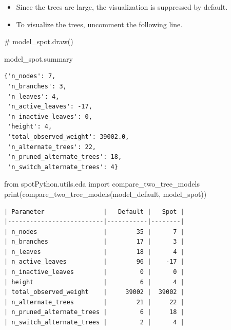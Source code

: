 \documentclass[
  letterpaper,
  DIV=11,
  numbers=noendperiod]{scrreprt}
\newenvironment{Shaded}{\begin{snugshade}}{\end{snugshade}}
\newcommand{\BuiltInTok}[1]{\textcolor[rgb]{0.00,0.23,0.31}{#1}}
\newcommand{\CommentTok}[1]{\textcolor[rgb]{0.37,0.37,0.37}{#1}}
\newcommand{\ImportTok}[1]{\textcolor[rgb]{0.00,0.46,0.62}{#1}}
\newcommand{\NormalTok}[1]{\textcolor[rgb]{0.00,0.23,0.31}{#1}}
\providecommand{\tightlist}{%
  \setlength{\itemsep}{0pt}\setlength{\parskip}{0pt}}\usepackage{longtable,booktabs,array}
\begin{document}
\begin{tcolorbox}[enhanced jigsaw, left=2mm, title=\textcolor{quarto-callout-caution-color}{\faFire}\hspace{0.5em}{Caution: Large Trees}, titlerule=0mm, toprule=.15mm, leftrule=.75mm, colbacktitle=quarto-callout-caution-color!10!white, colback=white, arc=.35mm, toptitle=1mm, bottomtitle=1mm, colframe=quarto-callout-caution-color-frame, bottomrule=.15mm, rightrule=.15mm, breakable, coltitle=black, opacitybacktitle=0.6, opacityback=0]

\begin{itemize}
\tightlist
\item
  Since the trees are large, the visualization is suppressed by default.
\item
  To visualize the trees, uncomment the following line.
\end{itemize}

\end{tcolorbox}

\begin{Shaded}
\begin{Highlighting}[]
\CommentTok{\# model\_spot.draw()}
\end{Highlighting}
\end{Shaded}

\begin{Shaded}
\begin{Highlighting}[]
\NormalTok{model\_spot.summary}
\end{Highlighting}
\end{Shaded}

\begin{verbatim}
{'n_nodes': 7,
 'n_branches': 3,
 'n_leaves': 4,
 'n_active_leaves': -17,
 'n_inactive_leaves': 0,
 'height': 4,
 'total_observed_weight': 39002.0,
 'n_alternate_trees': 22,
 'n_pruned_alternate_trees': 18,
 'n_switch_alternate_trees': 4}
\end{verbatim}

\begin{Shaded}
\begin{Highlighting}[]
\ImportTok{from}\NormalTok{ spotPython.utils.eda }\ImportTok{import}\NormalTok{ compare\_two\_tree\_models}
\BuiltInTok{print}\NormalTok{(compare\_two\_tree\_models(model\_default, model\_spot))}
\end{Highlighting}
\end{Shaded}

\begin{verbatim}
| Parameter                |   Default |   Spot |
|--------------------------|-----------|--------|
| n_nodes                  |        35 |      7 |
| n_branches               |        17 |      3 |
| n_leaves                 |        18 |      4 |
| n_active_leaves          |        96 |    -17 |
| n_inactive_leaves        |         0 |      0 |
| height                   |         6 |      4 |
| total_observed_weight    |     39002 |  39002 |
| n_alternate_trees        |        21 |     22 |
| n_pruned_alternate_trees |         6 |     18 |
| n_switch_alternate_trees |         2 |      4 |
\end{verbatim}
\end{document}
